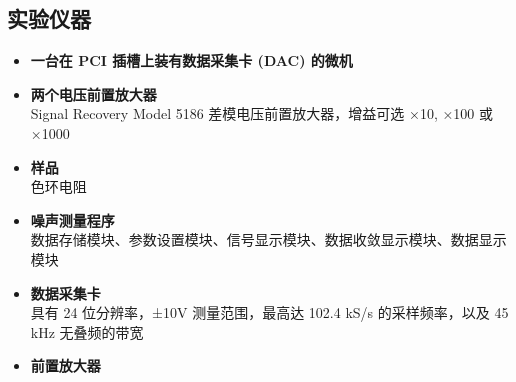 \documentclass[a4paper]{article}
\begin{document}
\subsection{实验仪器}\label{sub:sysover}
\begin{itemize}
\item{\textbf{⼀台在 PCI 插槽上装有数据采集卡 (DAC) 的微机}}
\item{\textbf{两个电压前置放⼤器}}\\
Signal Recovery Model 5186 差模电压前置放⼤器，增益可选 ×10, ×100 或 ×1000
\item{\textbf{样品}}\\
⾊环电阻
\item{\textbf{噪声测量程序}}\\
数据存储模块、参数设置模块、信号显示模块、数据收敛显示模块、数据显示模块
\item{\textbf{数据采集卡}}\\
具有 24 位分辨率，±10V 测量范围，最⾼达 102.4 kS/s 的采样频率，以及 45 kHz ⽆叠频的带宽
\item{\textbf{前置放⼤器}}


\end{itemize}

\end{document}
